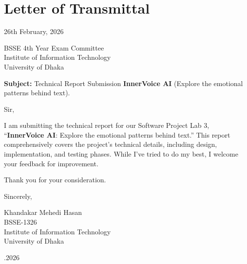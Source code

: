 \documentclass[12pt,a4paper]{report}
\begin{document}
\chapter*{Letter of Transmittal}

\vspace{1cm}

\noindent 26th February, 2026

\vspace{1cm}

\noindent BSSE 4th Year Exam Committee\\
Institute of Information Technology\\
University of Dhaka

\vspace{1cm}

\noindent \textbf{Subject:} Technical Report Submission \textbf{InnerVoice AI} (Explore the emotional patterns behind text).

\vspace{1cm}

\noindent Sir,

\vspace{0.5cm}

I am submitting the technical report for our Software Project Lab 3, ``\textbf{InnerVoice AI}: Explore the emotional patterns behind text.'' This report comprehensively covers the project's technical details, including design, implementation, and testing phases. While I've tried to do my best, I welcome your feedback for improvement.

\vspace{0.5cm}

Thank you for your consideration.

\vspace{1cm}

\noindent Sincerely,

\vspace{0.5cm}

\noindent Khandakar Mehedi Hasan\\
BSSE-1326\\
Institute of Information Technology\\
University of Dhaka

\vspace{2cm}

.2026
\end{document}
